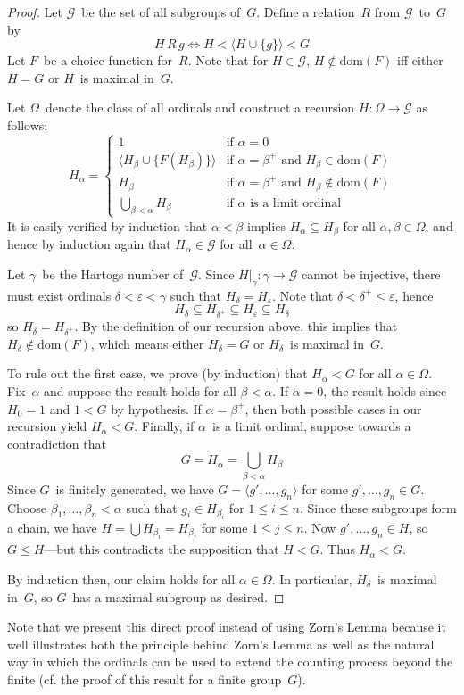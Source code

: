 \documentclass[letterpaper]{article}
\newcommand{\G}{\mathcal{G}}
\newcommand{\union}{\cup}
\newcommand{\bigunion}{\bigcup}
\newcommand{\subgroup}{\le}
\newcommand{\dom}{\mathrm{dom}}
\newcommand{\gen}[1]{\langle{#1}\rangle}
\newcommand{\relates}[3]{{#2}\,{#1}\,{#3}}
\begin{document}
\begin{proof}
Let $\G$~be the set of all subgroups of~$G$. Define a relation~$R$ from $\G$~to~$G$ by
$$\relates{R}{H}{g}\iff H<\gen{H\union\{g\}}<G$$
Let $F$~be a choice function for~$R$. Note that for $H\in\G$, $H\not\in\dom(F)$ iff either $H=G$ or $H$~is maximal in~$G$.

Let $\Omega$~denote the class of all ordinals and construct a recursion $H:\Omega\to\G$ as follows:
$$H_{\alpha}=
\begin{cases}
1&\text{if }\alpha=0\\
\gen{H_{\beta}\union\{F(H_{\beta})\}}&\text{if }\alpha=\beta^+\text{ and }H_{\beta}\in\dom(F)\\
H_{\beta}&\text{if }\alpha=\beta^+\text{ and }H_{\beta}\not\in\dom(F)\\
\bigunion_{\beta<\alpha}H_{\beta}&\text{if }\alpha\text{ is a limit ordinal}
\end{cases}$$
It is easily verified by induction that $\alpha<\beta$ implies $H_{\alpha}\subseteq H_{\beta}$ for all $\alpha,\beta\in\Omega$, and hence by induction again that $H_{\alpha}\in\G$ for all~$\alpha\in\Omega$.

Let $\gamma$~be the Hartogs number of~$\G$. Since $H|_{\gamma}:\gamma\to\G$ cannot be injective, there must exist ordinals $\delta<\varepsilon<\gamma$ such that $H_{\delta}=H_{\varepsilon}$. Note that $\delta<\delta^+\le\varepsilon$, hence
$$H_{\delta}\subseteq H_{\delta^+}\subseteq H_{\varepsilon}\subseteq H_{\delta}$$
so $H_{\delta}=H_{\delta^+}$. By the definition of our recursion above, this implies that $H_{\delta}\not\in\dom(F)$, which means either $H_{\delta}=G$ or $H_{\delta}$~is maximal in~$G$.

To rule out the first case, we prove (by induction) that $H_{\alpha}<G$ for all $\alpha\in\Omega$. Fix~$\alpha$ and suppose the result holds for all $\beta<\alpha$. If $\alpha=0$, the result holds since $H_0=1$ and $1<G$ by hypothesis. If $\alpha=\beta^+$, then both possible cases in our recursion yield $H_{\alpha}<G$. Finally, if $\alpha$~is a limit ordinal, suppose towards a contradiction that
$$G=H_{\alpha}=\bigunion_{\beta<\alpha}H_{\beta}$$
Since $G$~is finitely generated, we have $G=\gen{g',\ldots,g_n}$ for some $g',\ldots,g_n\in G$. Choose $\beta_1,\ldots,\beta_n<\alpha$ such that $g_i\in H_{\beta_i}$ for $1\le i\le n$. Since these subgroups form a chain, we have $H=\bigunion H_{\beta_i}=H_{\beta_j}$ for some $1\le j\le n$. Now $g',\ldots,g_n\in H$, so $G\subgroup H$---but this contradicts the supposition that $H<G$. Thus $H_{\alpha}<G$.

By induction then, our claim holds for all $\alpha\in\Omega$. In particular, $H_{\delta}$~is maximal in~$G$, so $G$~has a maximal subgroup as desired.
\end{proof}
\noindent Note that we present this direct proof instead of using Zorn's Lemma because it well illustrates both the principle behind Zorn's Lemma as well as the natural way in which the ordinals can be used to extend the counting process beyond the finite (cf. the proof of this result for a finite group~$G$).
\end{document}
